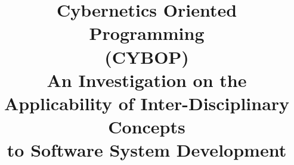 %
%
%
%
%
%
%

%
%
%
%
\begin{titlepage}
    \title{
        Cybernetics Oriented Programming\\
        (CYBOP)\\
        \vspace{1cm}
        \normalsize{\textmd{An Investigation on the Applicability of Inter-Disciplinary Concepts\\
            to Software System Development\\}}
    }
    \author{
        \date{
        }
    }
\end{titlepage}
